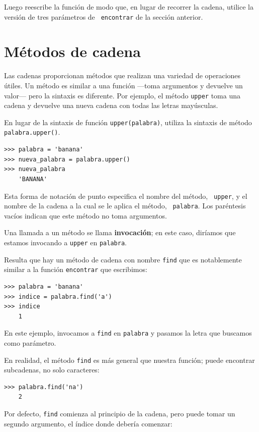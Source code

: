 \documentclass[10pt]{book}
\begin{document}
Luego reescribe la función de modo que, en lugar de
recorrer la cadena, utilice la versión de tres parámetros de {\tt
encontrar} de la sección anterior.


\section{Métodos de cadena}
\label{optional}

Las cadenas proporcionan métodos que realizan una variedad de operaciones útiles.
Un método es similar a una función ---toma argumentos y
devuelve un valor--- pero la sintaxis es diferente.  Por ejemplo, el
método {\tt upper} toma una cadena y devuelve una nueva cadena con
todas las letras mayúsculas.

En lugar de la sintaxis de función {\tt upper(palabra)}, utiliza
la sintaxis de método {\tt palabra.upper()}.

\begin{verbatim}
>>> palabra = 'banana'
>>> nueva_palabra = palabra.upper()
>>> nueva_palabra
    'BANANA'
\end{verbatim}
%
Esta forma de notación de punto especifica el nombre del método, {\tt
upper}, y el nombre de la cadena a la cual se le aplica el método, {\tt
palabra}.  Los paréntesis vacíos indican que este método no toma
argumentos.

Una llamada a un método se llama {\bf invocación}; en este caso,
diríamos que estamos invocando a {\tt upper} en {\tt palabra}.

Resulta que hay un método de cadena con nombre {\tt find} que
es notablemente similar a la función {\tt encontrar} que escribimos:

\begin{verbatim}
>>> palabra = 'banana'
>>> indice = palabra.find('a')
>>> indice
    1
\end{verbatim}
%
En este ejemplo, invocamos a {\tt find} en {\tt palabra} y pasamos
la letra que buscamos como parámetro.

En realidad, el método {\tt find} es más general que nuestra función;
puede encontrar subcadenas, no solo caracteres:

\begin{verbatim}
>>> palabra.find('na')
    2
\end{verbatim}
%
Por defecto, {\tt find} comienza al principio de la cadena, pero
puede tomar un segundo argumento, el índice donde debería comenzar:
\end{document}
